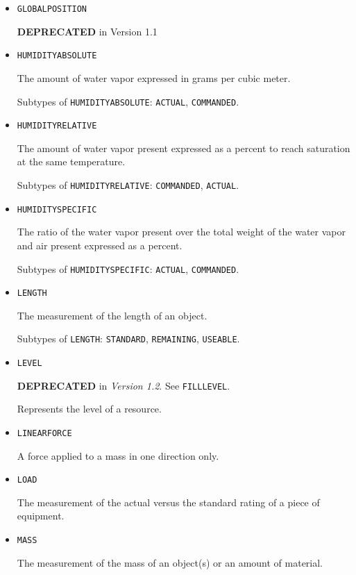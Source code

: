\begin{itemize}
\item \texttt{GLOBAL\textunderscore POSITION}  

\textbf{DEPRECATED} in Version 1.1


\item \texttt{HUMIDITY\textunderscore ABSOLUTE}  

The amount of water vapor expressed in grams per cubic meter.

Subtypes of \texttt{HUMIDITY\textunderscore ABSOLUTE}: \texttt{ACTUAL}, \texttt{COMMANDED}.

\item \texttt{HUMIDITY\textunderscore RELATIVE}  

The amount of water vapor present expressed as a percent to reach saturation at the same temperature.

Subtypes of \texttt{HUMIDITY\textunderscore RELATIVE}: \texttt{COMMANDED}, \texttt{ACTUAL}.

\item \texttt{HUMIDITY\textunderscore SPECIFIC}  

The ratio of the water vapor present over the total weight of the water vapor and air present expressed as a percent.

Subtypes of \texttt{HUMIDITY\textunderscore SPECIFIC}: \texttt{ACTUAL}, \texttt{COMMANDED}.

\item \texttt{LENGTH}  

The measurement of the length of an object.

Subtypes of \texttt{LENGTH}: \texttt{STANDARD}, \texttt{REMAINING}, \texttt{USEABLE}.

\item \texttt{LEVEL}  

\textbf{DEPRECATED} in \textit{Version 1.2}.  See \texttt{FILL\textunderscore LEVEL}.

Represents the level of a resource.


\item \texttt{LINEAR\textunderscore FORCE}  

A \gls{force} applied to a mass in one direction only.


\item \texttt{LOAD}  

The measurement of the actual versus the standard rating of a piece of equipment.


\item \texttt{MASS}  

The measurement of the mass of an object(s) or an amount of material.



\end{itemize}
